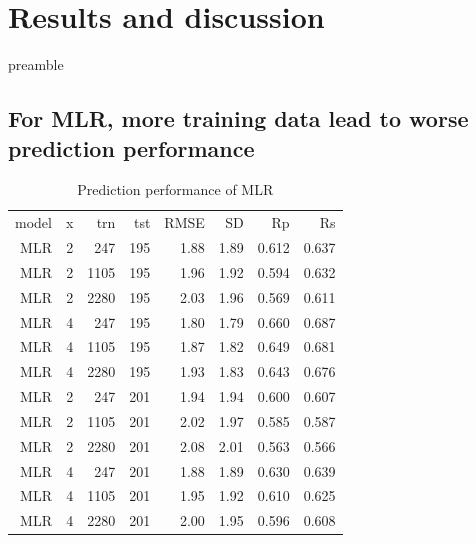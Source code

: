 \documentclass[journal=jacsat,manuscript=article]{achemso}
\begin{document}
\section{Results and discussion}

preamble

\subsection{For MLR, more training data lead to worse prediction performance}

\begin{table}
\caption{Prediction performance of MLR}
\label{tbl:performance}
\begin{tabular}{rrrrrrrr}
\hline
model & x & trn & tst & RMSE & SD & Rp & Rs\\
MLR & 2 &  247 & 195 & 1.88 & 1.89 & 0.612 & 0.637\\
MLR & 2 & 1105 & 195 & 1.96 & 1.92 & 0.594 & 0.632\\
MLR & 2 & 2280 & 195 & 2.03 & 1.96 & 0.569 & 0.611\\
MLR & 4 &  247 & 195 & 1.80 & 1.79 & 0.660 & 0.687\\
MLR & 4 & 1105 & 195 & 1.87 & 1.82 & 0.649 & 0.681\\
MLR & 4 & 2280 & 195 & 1.93 & 1.83 & 0.643 & 0.676\\
MLR & 2 &  247 & 201 & 1.94 & 1.94 & 0.600 & 0.607\\
MLR & 2 & 1105 & 201 & 2.02 & 1.97 & 0.585 & 0.587\\
MLR & 2 & 2280 & 201 & 2.08 & 2.01 & 0.563 & 0.566\\
MLR & 4 &  247 & 201 & 1.88 & 1.89 & 0.630 & 0.639\\
MLR & 4 & 1105 & 201 & 1.95 & 1.92 & 0.610 & 0.625\\
MLR & 4 & 2280 & 201 & 2.00 & 1.95 & 0.596 & 0.608\\
\hline
\end{tabular}
\end{table}
\end{document}
